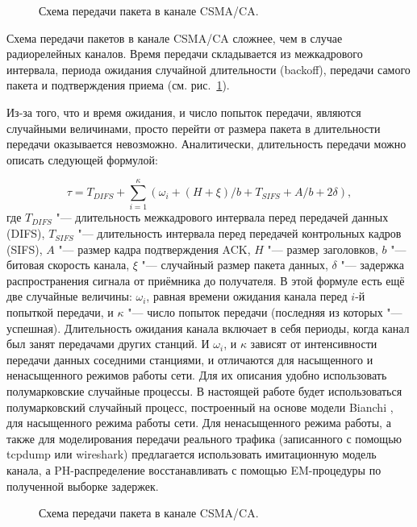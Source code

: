 \begin{figure}[h]
  \caption{Схема передачи пакета в канале CSMA/CA.}
  \label{fig:ch4_dcf_channel}
\end{figure}

Схема передачи пакетов в канале CSMA/CA сложнее, чем в случае радиорелейных каналов. Время передачи складывается из межкадрового интервала, периода ожидания случайной длительности (backoff), передачи самого пакета и подтверждения приема (см. рис.~\ref{fig:ch4_dcf_channel}).

Из-за того, что и время ожидания, и число попыток передачи, являются случайными величинами, просто перейти от размера пакета в длительности передачи оказывается невозможно. Аналитически, длительность передачи можно описать следующей формулой:

\begin{equation}
\tau = T_{DIFS}	+ \sum_{i=1}^{\kappa}(\omega_i + (H + \xi)/b + T_{SIFS} + A/b + 2\delta),
\end{equation}
где $T_{DIFS}$ "--- длительность межкадрового интервала перед передачей данных (DIFS), $T_{SIFS}$ "--- длительность интервала перед передачей контрольных кадров (SIFS), $A$ "--- размер кадра подтверждения ACK, $H$ "--- размер заголовков, $b$ "--- битовая скорость канала, $\xi$ "--- случайный размер пакета данных, $\delta$ "--- задержка распространения сигнала от приёмника до получателя. В этой формуле есть ещё две случайные величины: $\omega_i$, равная времени ожидания канала перед $i$-й попыткой передачи,  и $\kappa$ "--- число попыток передачи (последняя из которых "--- успешная). Длительность ожидания канала включает в себя периоды, когда канал был занят передачами других станций. И $\omega_i$, и $\kappa$ зависят от интенсивности передачи данных соседними станциями, и отличаются для насыщенного и ненасыщенного режимов работы сети. Для их описания удобно использовать полумарковские случайные процессы. В настоящей работе будет использоваться полумарковский случайный процесс, построенный на основе модели Bianchi \cite{Bianchi2000}, для насыщенного режима работы сети. Для ненасыщенного режима работы, а также для моделирования передачи реального трафика (записанного с помощью tcpdump или wireshark) предлагается использовать имитационную модель канала, а PH-распределение восстанавливать с помощью EM-процедуры по полученной выборке задержек.

\begin{figure}[h]
  \caption{Схема передачи пакета в канале CSMA/CA.}
  \label{fig:ch4_smp_structure}
\end{figure}

